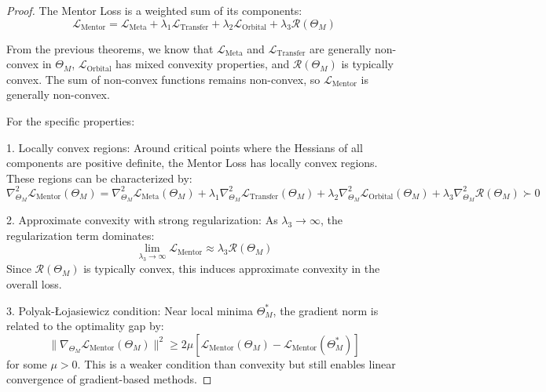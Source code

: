 \begin{proof}
The Mentor Loss is a weighted sum of its components:
\begin{equation}
\mathcal{L}_{\text{Mentor}} = \mathcal{L}_{\text{Meta}} + \lambda_1 \mathcal{L}_{\text{Transfer}} + \lambda_2 \mathcal{L}_{\text{Orbital}} + \lambda_3 \mathcal{R}(\Theta_M)
\end{equation}

From the previous theorems, we know that $\mathcal{L}_{\text{Meta}}$ and $\mathcal{L}_{\text{Transfer}}$ are generally non-convex in $\Theta_M$, $\mathcal{L}_{\text{Orbital}}$ has mixed convexity properties, and $\mathcal{R}(\Theta_M)$ is typically convex. The sum of non-convex functions remains non-convex, so $\mathcal{L}_{\text{Mentor}}$ is generally non-convex.

For the specific properties:

1. Locally convex regions: Around critical points where the Hessians of all components are positive definite, the Mentor Loss has locally convex regions. These regions can be characterized by:
\begin{equation}
\nabla^2_{\Theta_M} \mathcal{L}_{\text{Mentor}}(\Theta_M) = \nabla^2_{\Theta_M} \mathcal{L}_{\text{Meta}}(\Theta_M) + \lambda_1 \nabla^2_{\Theta_M} \mathcal{L}_{\text{Transfer}}(\Theta_M) + \lambda_2 \nabla^2_{\Theta_M} \mathcal{L}_{\text{Orbital}}(\Theta_M) + \lambda_3 \nabla^2_{\Theta_M} \mathcal{R}(\Theta_M) \succ 0
\end{equation}

2. Approximate convexity with strong regularization: As $\lambda_3 \to \infty$, the regularization term dominates:
\begin{equation}
\lim_{\lambda_3 \to \infty} \mathcal{L}_{\text{Mentor}} \approx \lambda_3 \mathcal{R}(\Theta_M)
\end{equation}
Since $\mathcal{R}(\Theta_M)$ is typically convex, this induces approximate convexity in the overall loss.

3. Polyak-Łojasiewicz condition: Near local minima $\Theta_M^*$, the gradient norm is related to the optimality gap by:
\begin{equation}
\|\nabla_{\Theta_M} \mathcal{L}_{\text{Mentor}}(\Theta_M)\|^2 \geq 2\mu[\mathcal{L}_{\text{Mentor}}(\Theta_M) - \mathcal{L}_{\text{Mentor}}(\Theta_M^*)]
\end{equation}
for some $\mu > 0$. This is a weaker condition than convexity but still enables linear convergence of gradient-based methods.
\end{proof}

